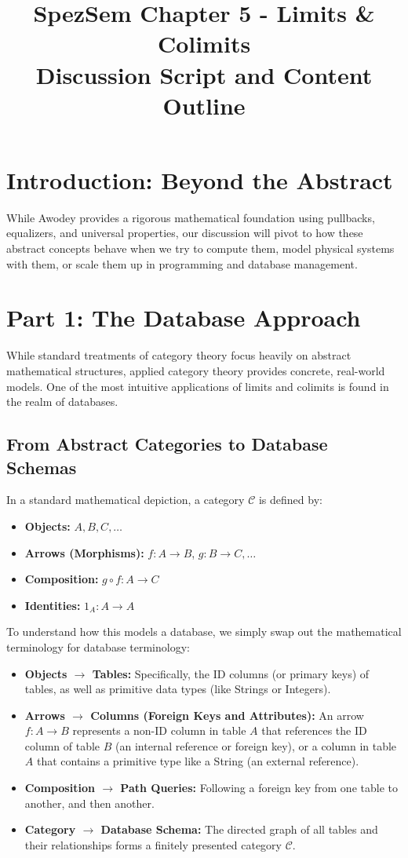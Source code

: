 \documentclass{article}
\title{SpezSem Chapter 5 - Limits \& Colimits\\ \large Discussion Script and Content Outline}
\author{}
\date{}
\begin{document}
\maketitle

\section*{Introduction: Beyond the Abstract}
While Awodey provides a rigorous mathematical foundation using pullbacks, equalizers, and universal properties, our discussion will pivot to how these abstract concepts behave when we try to compute them, model physical systems with them, or scale them up in programming and database management.

\section{Part 1: The Database Approach}
While standard treatments of category theory focus heavily on abstract mathematical structures, applied category theory provides concrete, real-world models. One of the most intuitive applications of limits and colimits is found in the realm of databases.

\subsection{From Abstract Categories to Database Schemas}
In a standard mathematical depiction, a category $\mathcal{C}$ is defined by:
\begin{itemize}
    \item \textbf{Objects:} $A, B, C, \dots$
    \item \textbf{Arrows (Morphisms):} $f: A \to B$, $g: B \to C, \dots$
    \item \textbf{Composition:} $g \circ f: A \to C$
    \item \textbf{Identities:} $1_A: A \to A$
\end{itemize}

To understand how this models a database, we simply swap out the mathematical terminology for database terminology:
\begin{itemize}
    \item \textbf{Objects $\to$ Tables:} Specifically, the ID columns (or primary keys) of tables, as well as primitive data types (like Strings or Integers).
    \item \textbf{Arrows $\to$ Columns (Foreign Keys and Attributes):} An arrow $f: A \to B$ represents a non-ID column in table $A$ that references the ID column of table $B$ (an internal reference or foreign key), or a column in table $A$ that contains a primitive type like a String (an external reference).
    \item \textbf{Composition $\to$ Path Queries:} Following a foreign key from one table to another, and then another.
    \item \textbf{Category $\to$ Database Schema:} The directed graph of all tables and their relationships forms a finitely presented category $\mathcal{C}$.
\end{itemize}
\end{document}
